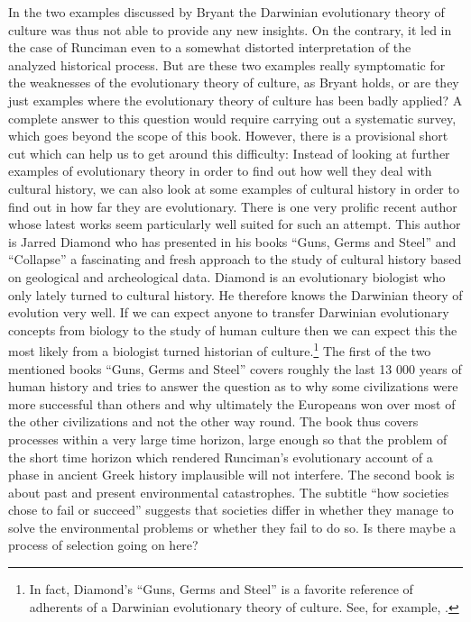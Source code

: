 In the two examples discussed by Bryant the Darwinian evolutionary
theory of culture was thus not able to provide any new insights. On
the contrary, it led in the case of Runciman even to a somewhat
distorted interpretation of the analyzed historical process. But are
these two examples really symptomatic for the weaknesses of the
evolutionary theory of culture, as Bryant holds, or are they just
examples where the evolutionary theory of culture has been badly
applied?  A complete answer to this question would require carrying
out a systematic survey, which goes beyond the scope of this
book. However, there is a provisional short cut which can help us to
get around this difficulty: Instead of looking at further examples of
evolutionary theory in order to find out how well they deal with
cultural history, we can also look at some examples of cultural
history in order to find out in how far they are evolutionary.  There
is one very prolific recent author whose latest works seem
particularly well suited for such an attempt. This author is Jarred
Diamond who has presented in his books ``Guns, Germs and Steel''
\cite[]{diamond:1997} and ``Collapse'' \cite[]{diamond:2005} a
fascinating and fresh approach to the study of cultural history based
on geological and archeological data. Diamond is an evolutionary
biologist who only lately turned to cultural history. He therefore
knows the Darwinian theory of evolution very well. If we can expect
anyone to transfer Darwinian evolutionary concepts from biology to the
study of human culture then we can expect this the most likely from a
biologist turned historian of culture.\footnote{In fact, Diamond's
  ``Guns, Germs and Steel'' is a favorite reference of adherents of a
  Darwinian evolutionary theory of culture. See, for example,
  \cite[p.\ 104f.]{dennett:2006}.} The first of the two mentioned books
``Guns, Germs and Steel'' covers roughly the last 13 000 years of
human history and tries to answer the question as to why some
civilizations were more successful than others and why ultimately the
Europeans won over most of the other civilizations and not the other
way round. The book thus covers processes within a very large time
horizon, large enough so that the problem of the short time horizon
which rendered Runciman's evolutionary account of a phase in ancient
Greek history implausible will not interfere. The second book is about
past and present environmental catastrophes. The subtitle ``how
societies chose to fail or succeed'' suggests that societies differ in
whether they manage to solve the environmental problems or whether
they fail to do so.  Is there maybe a process of selection going on here?

